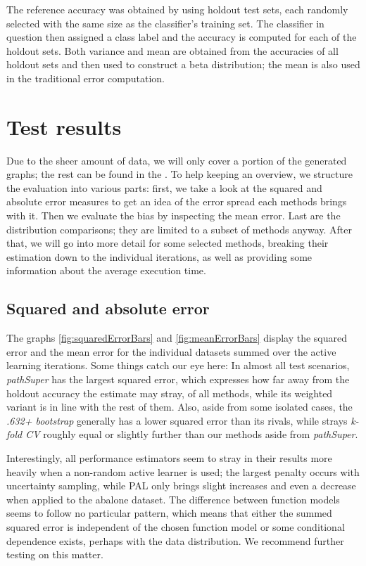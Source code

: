 The reference accuracy was obtained by using holdout test sets, each randomly selected with the same size as the classifier's training set. The classifier in question then assigned a class label and the accuracy is computed for each of the holdout sets. Both variance and mean are obtained from the accuracies of all holdout sets and then used to construct a beta distribution; the mean is also used in the traditional error computation.

\section{Test results}

Due to the sheer amount of data, we will only cover a portion of the generated graphs; the rest can be found in the . To help keeping an overview, we structure the evaluation into various parts: first, we take a look at the squared and absolute error measures to get an idea of the error spread each methods brings with it. Then we evaluate the bias by inspecting the mean error. Last are the distribution comparisons; they are limited to a subset of methods anyway. After that, we will go into more detail for some selected methods, breaking their estimation down to the individual iterations, as well as providing some information about the average execution time.

\subsection{Squared and absolute error}

The graphs \ref{fig:squaredErrorBars} and \ref{fig:meanErrorBars} display the squared error and the mean error for the individual datasets summed over the active learning iterations. Some things catch our eye here: In almost all test scenarios, \textit{pathSuper} has the largest squared error, which expresses how far away from the holdout accuracy the estimate may stray, of all methods, while its weighted variant is in line with the rest of them. Also, aside from some isolated cases, the \textit{.632+ bootstrap} generally has a lower squared error than its rivals, while strays \textit{k-fold CV} roughly equal or slightly further than our methods aside from \textit{pathSuper}.

Interestingly, all performance estimators seem to stray in their results more heavily when a non-random active learner is used; the largest penalty occurs with uncertainty sampling, while PAL only brings slight increases and even a decrease when applied to the abalone dataset. The difference between function models seems to follow no particular pattern, which means that either the summed squared error is independent of the chosen function model or some conditional dependence exists, perhaps with the data distribution. We recommend further testing on this matter.

